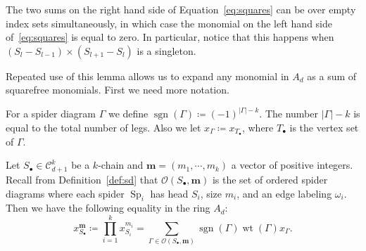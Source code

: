 \documentclass[ALCO,ThmDefs,Unicode,epreuves]{cedram}
\newcommand{\bm}[1]{{\boldsymbol{#1}}}
\newcommand\m{\bm{m}}
\DeclareMathOperator{\wt}{wt}
\DeclareMathOperator{\Sp}{Sp}
\DeclareMathOperator{\sgn}{sgn}
\newcommand{\D}{{\Gamma}}
\newcommand{\lspd}{\mathcal O}
\newcommand{\CC}{\mathcal{C}}
\begin{document}
\begin{rema}\label{rem:zerocase}
	The two sums on the right hand side of Equation~\eqref{eq:squares} can be over empty index sets simultaneously, in which case the monomial on the left hand side of~\eqref{eq:squares} is equal to zero. In particular, notice that this happens when $(S_{l}-S_{l-1})\times (S_{l+1}-S_{l})$ is a singleton.
\end{rema}




Repeated use of this lemma allows us to expand any monomial in $A_d$ as a sum of squarefree monomials.  First we need more notation. %

\begin{defi}
	For a spider diagram $\D$ we define $\sgn(\D)\coloneqq (-1)^{|\D|-k}$. The number $|\D|-k$ is equal to the total number of legs. Also we let $x_\D\coloneqq x_{T_\bullet}$, where $T_\bullet$ is the vertex set of $\D$.
\end{defi}

\begin{prop}\label{prop:expanding}
	Let $S_\bullet\in\CC_{d+1}^k$ be a $k$-chain and $\m = (m_1,\cdots,m_k)$ a vector of positive integers. 
	Recall from Definition~\ref{def:sd} that $\lspd(S_\bullet,\m)$ is the set of ordered spider diagrams where each spider $\Sp_i$ has head $S_i$, size $m_i$, and an edge labeling $\omega_i$.
	Then we have the following equality in the ring $A_d$:
	\begin{equation}\label{eq:expansion}
	x_{S_\bullet}^\m\coloneqq \prod_{i=1}^k x_{S_i}^{m_i} = \sum_{\D\in\lspd(S_\bullet,\m)}\sgn(\D)\wt(\D)x_\D.
	\end{equation}
\end{prop}
\end{document}
